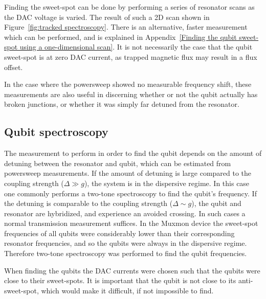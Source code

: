         Finding the sweet-spot can be done by performing a series of resonator scans as the DAC voltage is varied. The result of such a 2D scan shown in Figure~\ref{fig:tracked spectroscopy}. There is an alternative, faster measurement which can be performed, and is explained in Appendix~\ref{Finding the qubit sweet-spot using a one-dimensional scan}. It is not necessarily the case that the qubit sweet-spot is at zero DAC current, as trapped magnetic flux may result in a flux offset.

        In the case where the powersweep showed no measurable frequency shift, these measurements are also useful in discerning whether or not the qubit actually has broken junctions, or whether it was simply far detuned from the resonator.

      \subsection{Qubit spectroscopy}
        \label{sec:spectroscopy}

        The measurement to perform in order to find the qubit depends on the amount of detuning between the resonator and qubit, which can be estimated from powersweep measurements. If the amount of detuning is large compared to the coupling strength ($\Delta \gg  g$), the system is in the dispersive regime. In this case one commonly performs a two-tone spectroscopy to find the qubit's frequency. If the detuning is comparable to the coupling strength ($\Delta \sim g$), the qubit and resonator are hybridized, and experience an avoided crossing. In such cases a normal transmission measurement suffices. In the Muxmon device the sweet-spot frequencies of all qubits were considerably lower than their corresponding resonator frequencies, and so the qubits were always in the dispersive regime. Therefore two-tone spectroscopy was performed to find the qubit frequencies.

        When finding the qubits the DAC currents were chosen such that the qubits were close to their sweet-spots. It is important that the qubit is not close to its anti-sweet-spot, which would make it difficult, if not impossible to find.

